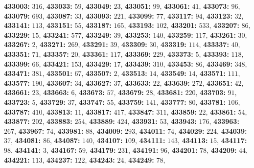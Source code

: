 \textsf{\bfseries 433003:} $316$, \textsf{\bfseries 433033:} $59$, \textsf{\bfseries 433049:} $23$, \textsf{\bfseries 433051:} $99$, \textsf{\bfseries 433061:} $41$, \textsf{\bfseries 433073:} $96$, \textsf{\bfseries 433079:} $693$, \textsf{\bfseries 433087:} $33$, \textsf{\bfseries 433093:} $221$, \textsf{\bfseries 433099:} $77$, \textsf{\bfseries 433117:} $94$, \textsf{\bfseries 433123:} $32$, \textsf{\bfseries 433141:} $113$, \textsf{\bfseries 433151:} $55$, \textsf{\bfseries 433187:} $165$, \textsf{\bfseries 433193:} $102$, \textsf{\bfseries 433201:} $533$, \textsf{\bfseries 433207:} $86$, \textsf{\bfseries 433229:} $15$, \textsf{\bfseries 433241:} $577$, \textsf{\bfseries 433249:} $39$, \textsf{\bfseries 433253:} $140$, \textsf{\bfseries 433259:} $117$, \textsf{\bfseries 433261:} $30$, \textsf{\bfseries 433267:} $2$, \textsf{\bfseries 433271:} $269$, \textsf{\bfseries 433291:} $39$, \textsf{\bfseries 433309:} $30$, \textsf{\bfseries 433319:} $114$, \textsf{\bfseries 433337:} $40$, \textsf{\bfseries 433351:} $71$, \textsf{\bfseries 433357:} $20$, \textsf{\bfseries 433361:} $117$, \textsf{\bfseries 433369:} $229$, \textsf{\bfseries 433373:} $5$, \textsf{\bfseries 433393:} $118$, \textsf{\bfseries 433399:} $66$, \textsf{\bfseries 433421:} $153$, \textsf{\bfseries 433429:} $17$, \textsf{\bfseries 433439:} $310$, \textsf{\bfseries 433453:} $86$, \textsf{\bfseries 433469:} $348$, \textsf{\bfseries 433471:} $381$, \textsf{\bfseries 433501:} $67$, \textsf{\bfseries 433507:} $2$, \textsf{\bfseries 433513:} $14$, \textsf{\bfseries 433549:} $14$, \textsf{\bfseries 433571:} $111$, \textsf{\bfseries 433577:} $190$, \textsf{\bfseries 433607:} $34$, \textsf{\bfseries 433627:} $37$, \textsf{\bfseries 433633:} $22$, \textsf{\bfseries 433639:} $272$, \textsf{\bfseries 433651:} $42$, \textsf{\bfseries 433661:} $23$, \textsf{\bfseries 433663:} $6$, \textsf{\bfseries 433673:} $57$, \textsf{\bfseries 433679:} $28$, \textsf{\bfseries 433681:} $220$, \textsf{\bfseries 433703:} $91$, \textsf{\bfseries 433723:} $5$, \textsf{\bfseries 433729:} $37$, \textsf{\bfseries 433747:} $55$, \textsf{\bfseries 433759:} $141$, \textsf{\bfseries 433777:} $80$, \textsf{\bfseries 433781:} $106$, \textsf{\bfseries 433787:} $410$, \textsf{\bfseries 433813:} $11$, \textsf{\bfseries 433817:} $417$, \textsf{\bfseries 433847:} $311$, \textsf{\bfseries 433859:} $22$, \textsf{\bfseries 433861:} $54$, \textsf{\bfseries 433877:} $202$, \textsf{\bfseries 433883:} $254$, \textsf{\bfseries 433889:} $424$, \textsf{\bfseries 433931:} $53$, \textsf{\bfseries 433943:} $176$, \textsf{\bfseries 433963:} $267$, \textsf{\bfseries 433967:} $74$, \textsf{\bfseries 433981:} $88$, \textsf{\bfseries 434009:} $293$, \textsf{\bfseries 434011:} $74$, \textsf{\bfseries 434029:} $224$, \textsf{\bfseries 434039:} $37$, \textsf{\bfseries 434081:} $86$, \textsf{\bfseries 434087:} $140$, \textsf{\bfseries 434107:} $109$, \textsf{\bfseries 434111:} $143$, \textsf{\bfseries 434113:} $15$, \textsf{\bfseries 434117:} $98$, \textsf{\bfseries 434141:} $3$, \textsf{\bfseries 434167:} $59$, \textsf{\bfseries 434179:} $231$, \textsf{\bfseries 434191:} $96$, \textsf{\bfseries 434201:} $78$, \textsf{\bfseries 434209:} $44$, \textsf{\bfseries 434221:} $113$, \textsf{\bfseries 434237:} $122$, \textsf{\bfseries 434243:} $24$, \textsf{\bfseries 434249:} $78$, 
